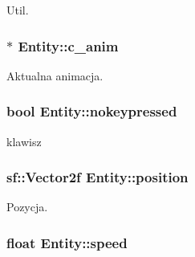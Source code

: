 Util. 


\begin{DoxyItemize}
\item 
\end{DoxyItemize}\hypertarget{class_entity_a60767e4984ab5817623a970f40c51591}{
\subsubsection[{c\-\_\-anim}]{$\ast$ Entity\-::c\-\_\-anim\hspace{0.3cm}{\ttfamily [protected]}}}\label{class_entity_a60767e4984ab5817623a970f40c51591}


Aktualna animacja. 


\begin{DoxyItemize}
\item 
\end{DoxyItemize}\hypertarget{class_entity_a819f25d4808e9e06d2e3af164b901350}{
\subsubsection[{nokeypressed}]{\setlength{\rightskip}{0pt plus 5cm}bool Entity\-::nokeypressed\hspace{0.3cm}{\ttfamily [protected]}}}\label{class_entity_a819f25d4808e9e06d2e3af164b901350}


klawisz 


\begin{DoxyItemize}
\item 
\end{DoxyItemize}\hypertarget{class_entity_afc349ec89c2bffef70bf6a1d95603154}{
\subsubsection[{position}]{\setlength{\rightskip}{0pt plus 5cm}sf\-::\-Vector2f Entity\-::position\hspace{0.3cm}{\ttfamily [protected]}}}\label{class_entity_afc349ec89c2bffef70bf6a1d95603154}


Pozycja. 


\begin{DoxyItemize}
\item 
\end{DoxyItemize}\hypertarget{class_entity_a1de3d8d9ab8088f61e6726069b26fa60}{
\subsubsection[{speed}]{\setlength{\rightskip}{0pt plus 5cm}float Entity\-::speed\hspace{0.3cm}{\ttfamily [protected]}}}\label{class_entity_a1de3d8d9ab8088f61e6726069b26fa60}


